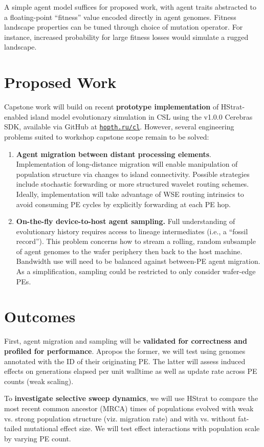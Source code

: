 A simple agent model suffices for proposed work, with agent traits abstracted to a floating-point ``fitness'' value encoded directly in agent genomes.
Fitness landscape properties can be tuned through choice of mutation operator.
For instance, increased probability for large fitness losses would simulate a rugged landscape.

\section{Proposed Work}

Capstone work will build on recent \textbf{prototype implementation} of HStrat-enabled island model evolutionary simulation in CSL using the v1.0.0 Cerebras SDK, available via GitHub at \texttt{\href{https://hopth.ru/cl}{hopth.ru/cl}}.
However, several engineering problems suited to workshop capstone scope remain to be solved:
\begin{enumerate}[leftmargin=*]
\item \textbf{Agent migration between distant processing elements}.
Implementation of long-distance migration will enable manipulation of population structure via changes to island connectivity.
Possible strategies include stochastic forwarding or more structured wavelet routing schemes.
Ideally, implementation will take advantage of WSE routing intrinsics to avoid consuming PE cycles by explicitly forwarding at each PE hop.

\item \textbf{On-the-fly device-to-host agent sampling.}
Full understanding of evolutionary history requires access to lineage intermediates (i.e., a ``fossil record'').
This problem concerns how to stream a rolling, random subsample of agent genomes to the wafer periphery then back to the host machine.
Bandwidth use will need to be balanced against between-PE agent migration.
As a simplification, sampling could be restricted to only consider wafer-edge PEs.
\end{enumerate}

\section{Outcomes}

First, agent migration and sampling will be \textbf{validated for correctness and profiled for performance}.
Apropos the former, we will test using genomes annotated with the ID of their originating PE.
The latter will assess induced effects on generations elapsed per unit walltime as well as update rate across PE counts (weak scaling).

To \textbf{investigate selective sweep dynamics}, we will use HStrat to compare the most recent common ancestor (MRCA) times of populations evolved with weak vs. strong population structure (viz. migration rate) and with vs. without fat-tailed mutational effect size.
We will test effect interactions with population scale by varying PE count.
